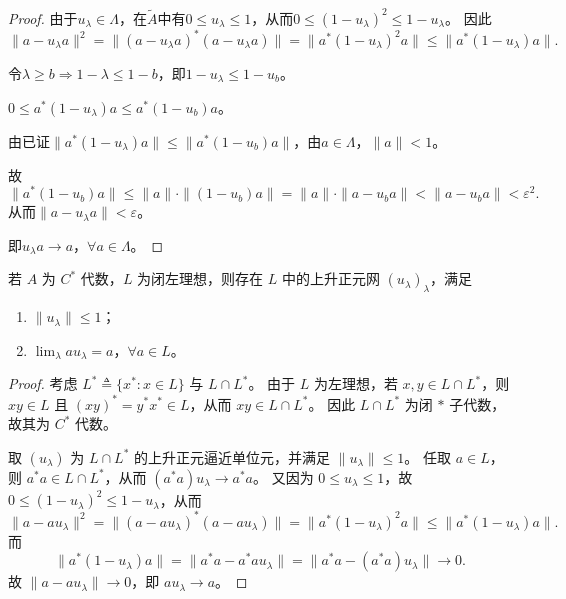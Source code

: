 \documentclass[lang=cn,a4paper,newtx,section]{elegantbook}
\begin{document}
\begin{proof}
    由于$u_\lambda \in \Lambda$，在$\tilde{A}$中有$0 \leq u_\lambda \leq 1$，从而$0 \leq (1 - u_\lambda)^2 \leq 1 - u_\lambda$。
    因此
    \begin{equation*}
      \|a - u_\lambda a\|^2 = \|(a - u_\lambda a)^*(a - u_\lambda a)\| = \|a^*(1 - u_\lambda)^2a\| \leq \|a^*(1 - u_\lambda)a\|.
    \end{equation*}
    
    令$\lambda \geq b \Rightarrow 1 - \lambda \leq 1 - b$，即$1 - u_\lambda \leq 1 - u_b$。
    
    $0 \leq a^*(1 - u_\lambda)a \leq a^*(1 - u_b)a$。
    
    由已证$\|a^*(1 - u_\lambda)a\| \leq \|a^*(1 - u_b)a\|$，由$a \in \Lambda$，$\|a\| < 1$。
    
    故
    \begin{equation*}
      \|a^*(1 - u_b)a\| \leq \|a\|\cdot\|(1 - u_b)a\| = \|a\|\cdot\|a - u_b a\| < \|a - u_b a\| < \varepsilon^2.
    \end{equation*}
    从而$\|a - u_\lambda a\| < \varepsilon$。
    
    即$u_\lambda a \to a$，$\forall a \in \Lambda$。
  \end{proof}

  \begin{lemma}\label{lem:left-ideal-approx}
    若 $A$ 为 $C^*$ 代数，$L$ 为闭左理想，则存在 $L$ 中的上升正元网 $(u_\lambda)_{\lambda}$，满足
    \begin{enumerate}
      \item $\|u_\lambda\|\le 1$；
      \item $\lim_{\lambda} au_\lambda=a$，$\forall a\in L$。
    \end{enumerate}
  \end{lemma}

  \begin{proof}
    考虑 $L^*\triangleq\{x^*:x\in L\}$ 与 $L\cap L^*$。
    由于 $L$ 为左理想，若 $x,y\in L\cap L^*$，则 $xy\in L$ 且 $(xy)^*=y^*x^*\in L$，从而 $xy\in L\cap L^*$。
    因此 $L\cap L^*$ 为闭 $*$ 子代数，故其为 $C^*$ 代数。

    取 $(u_\lambda)$ 为 $L\cap L^*$ 的上升正元逼近单位元，并满足 $\|u_\lambda\|\le 1$。
    任取 $a\in L$，则 $a^*a\in L\cap L^*$，从而 $(a^*a)u_\lambda\to a^*a$。
    又因为 $0\le u_\lambda\le 1$，故 $0\le (1-u_\lambda)^2\le 1-u_\lambda$，从而
    \begin{equation*}
      \|a-au_\lambda\|^2=\|(a-au_\lambda)^*(a-au_\lambda)\|=\|a^*(1-u_\lambda)^2a\|\le \|a^*(1-u_\lambda)a\|.
    \end{equation*}
    而
    \begin{equation*}
      \|a^*(1-u_\lambda)a\|=\|a^*a-a^*au_\lambda\|=\|a^*a-(a^*a)u_\lambda\|\to 0.
    \end{equation*}
    故 $\|a-au_\lambda\|\to 0$，即 $au_\lambda\to a$。
  \end{proof}
\end{document}
